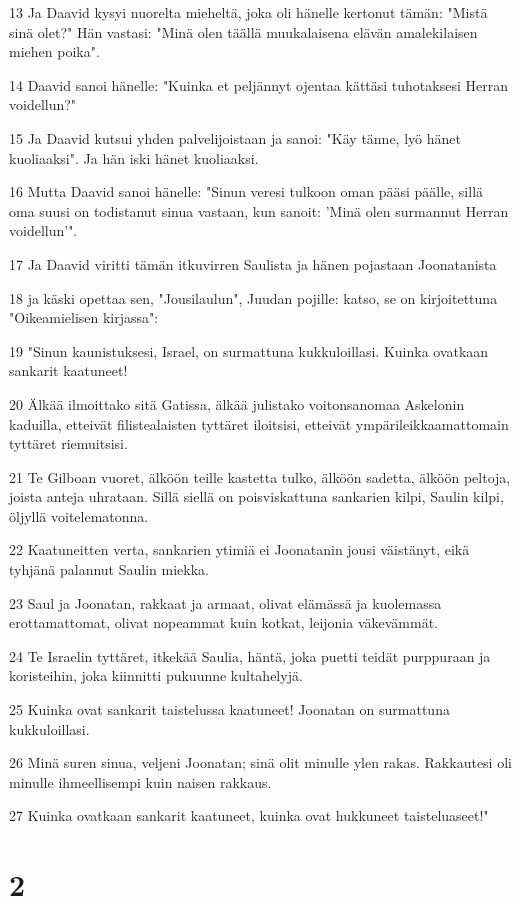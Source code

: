 \par 13 Ja Daavid kysyi nuorelta mieheltä, joka oli hänelle kertonut tämän: "Mistä sinä olet?" Hän vastasi: "Minä olen täällä muukalaisena elävän amalekilaisen miehen poika".
\par 14 Daavid sanoi hänelle: "Kuinka et peljännyt ojentaa kättäsi tuhotaksesi Herran voidellun?"
\par 15 Ja Daavid kutsui yhden palvelijoistaan ja sanoi: "Käy tänne, lyö hänet kuoliaaksi". Ja hän iski hänet kuoliaaksi.
\par 16 Mutta Daavid sanoi hänelle: "Sinun veresi tulkoon oman pääsi päälle, sillä oma suusi on todistanut sinua vastaan, kun sanoit: 'Minä olen surmannut Herran voidellun'".
\par 17 Ja Daavid viritti tämän itkuvirren Saulista ja hänen pojastaan Joonatanista
\par 18 ja käski opettaa sen, "Jousilaulun", Juudan pojille: katso, se on kirjoitettuna "Oikeamielisen kirjassa":
\par 19 "Sinun kaunistuksesi, Israel, on surmattuna kukkuloillasi. Kuinka ovatkaan sankarit kaatuneet!
\par 20 Älkää ilmoittako sitä Gatissa, älkää julistako voitonsanomaa Askelonin kaduilla, etteivät filistealaisten tyttäret iloitsisi, etteivät ympärileikkaamattomain tyttäret riemuitsisi.
\par 21 Te Gilboan vuoret, älköön teille kastetta tulko, älköön sadetta, älköön peltoja, joista anteja uhrataan. Sillä siellä on poisviskattuna sankarien kilpi, Saulin kilpi, öljyllä voitelematonna.
\par 22 Kaatuneitten verta, sankarien ytimiä ei Joonatanin jousi väistänyt, eikä tyhjänä palannut Saulin miekka.
\par 23 Saul ja Joonatan, rakkaat ja armaat, olivat elämässä ja kuolemassa erottamattomat, olivat nopeammat kuin kotkat, leijonia väkevämmät.
\par 24 Te Israelin tyttäret, itkekää Saulia, häntä, joka puetti teidät purppuraan ja koristeihin, joka kiinnitti pukuunne kultahelyjä.
\par 25 Kuinka ovat sankarit taistelussa kaatuneet! Joonatan on surmattuna kukkuloillasi.
\par 26 Minä suren sinua, veljeni Joonatan; sinä olit minulle ylen rakas. Rakkautesi oli minulle ihmeellisempi kuin naisen rakkaus.
\par 27 Kuinka ovatkaan sankarit kaatuneet, kuinka ovat hukkuneet taisteluaseet!"

\chapter{2}

